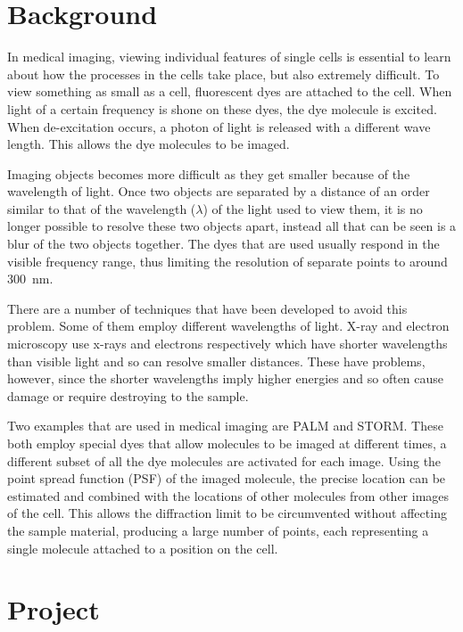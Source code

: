 
\section{Background}
\label{sec:background}

In medical imaging, viewing individual features of single cells is essential to
learn about how the processes in the cells take place, but also extremely
difficult. To view something as small as a cell, fluorescent dyes are attached
to the cell. When light of a certain frequency is shone on these dyes, the dye
molecule is excited. When de-excitation occurs, a photon of light is released
with a different wave length. This allows the dye molecules to be imaged.

Imaging objects becomes more difficult as they get smaller because of the
wavelength of light. Once two objects are separated by a distance of an order
similar to that of the wavelength ($\lambda$) of the light used to view them,
it is no longer possible to resolve these two objects apart, instead all that
can be seen is a blur of the two objects together. The dyes that are used
usually respond in the visible frequency range, thus limiting the resolution of
separate points to around \SI{300}{\nano\metre}.

There are a number of techniques that have been developed to avoid this
problem. Some of them employ different wavelengths of light. X-ray and electron
microscopy use x-rays and electrons respectively which have shorter wavelengths
than visible light and so can resolve smaller distances. These have problems,
however, since the shorter wavelengths imply higher energies and so often
cause damage or require destroying to the sample.

Two examples that are used in medical imaging are PALM\cite{owen2010palm} and
STORM\cite{rust2006sub}. These both employ special dyes that allow molecules to
be imaged at different times, a different subset of all the dye molecules are
activated for each image. Using the point spread function (PSF) of the imaged
molecule, the precise location can be estimated and combined with the locations
of other molecules from other images of the cell. This allows the diffraction
limit to be circumvented without affecting the sample material, producing a
large number of points, each representing a single molecule attached to a
position on the cell.

\section{Project}
\label{sec:project}

